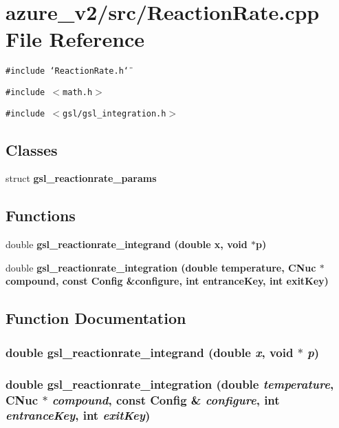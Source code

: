 \section{azure\_\-v2/src/Reaction\-Rate.cpp File Reference}
\label{ReactionRate_8cpp}
{\tt \#include \char`\"{}Reaction\-Rate.h\char`\"{}}\par
{\tt \#include $<$math.h$>$}\par
{\tt \#include $<$gsl/gsl\_\-integration.h$>$}\par
\subsection*{Classes}
\begin{CompactItemize}
\item 
struct \bf{gsl\_\-reactionrate\_\-params}
\end{CompactItemize}
\subsection*{Functions}
\begin{CompactItemize}
\item 
double \bf{gsl\_\-reactionrate\_\-integrand} (double x, void $\ast$p)
\item 
double \bf{gsl\_\-reactionrate\_\-integration} (double temperature, \bf{CNuc} $\ast$compound, const \bf{Config} \&configure, int entrance\-Key, int exit\-Key)
\end{CompactItemize}


\subsection{Function Documentation}
\subsubsection{\setlength{\rightskip}{0pt plus 5cm}double gsl\_\-reactionrate\_\-integrand (double {\em x}, void $\ast$ {\em p})}\label{ReactionRate_8cpp_59173caaa38ba0bcbcc55fda96031a9f}


\subsubsection{\setlength{\rightskip}{0pt plus 5cm}double gsl\_\-reactionrate\_\-integration (double {\em temperature}, \bf{CNuc} $\ast$ {\em compound}, const \bf{Config} \& {\em configure}, int {\em entrance\-Key}, int {\em exit\-Key})}\label{ReactionRate_8cpp_186fb255ef86fb574fa1773bd331c2a2}


